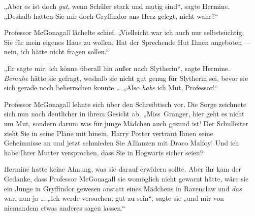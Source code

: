 „Aber es ist doch \emph{gut}, wenn Schüler stark und mutig sind“, sagte Hermine.
„Deshalb hatten Sie mir doch Gryffindor ans Herz gelegt, nicht wahr?“

Professor McGonagall lächelte schief.
„Vielleicht war ich auch nur selbstsüchtig, Sie für mein eigenes Haus zu wollen. Hat der Sprechende Hut Ihnen angeboten — nein, ich hätte nicht fragen sollen.“

„Er sagte mir, ich könne überall hin außer nach Slytherin“, sagte Hermine. \emph{Beinahe} hätte sie gefragt, weshalb sie nicht gut genug für Slytherin sei, bevor sie sich gerade noch beherrschen konnte …
„Also \emph{habe} ich Mut, Professor!“

Professor McGonagall lehnte sich über den Schreibtisch vor. Die Sorge zeichnete sich nun noch deutlicher in ihrem Gesicht ab.
„Miss~Granger, hier geht es nicht um Mut, sondern darum was für junge Mädchen auch gesund ist! Der Schulleiter zieht Sie in seine Pläne mit hinein, Harry Potter vertraut Ihnen seine Geheimnisse an und jetzt schmieden Sie Allianzen mit Draco Malfoy! Und ich habe Ihrer Mutter versprochen, dass Sie in Hogwarts sicher seien!“

Hermine hatte keine Ahnung, was sie darauf erwidern sollte. Aber ihr kam der Gedanke, dass Professor McGonagall sie womöglich nicht gewarnt hätte, wäre sie ein Junge in Gryffindor gewesen anstatt eines Mädchens in Ravenclaw und \emph{das} war, nun ja …
„Ich werde versuchen, gut zu sein“, sagte sie „und mir von niemandem etwas anderes sagen lassen.“

